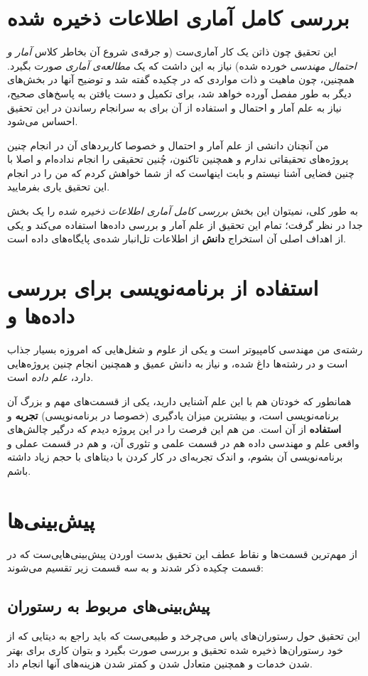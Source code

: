 \documentclass{article}
\begin{document}
	\section{بررسی کامل آماری اطلاعات ذخیره شده}
		این تحقیق چون ذاتن یک کار آماری‌ست (و جرقه‌ی شروع آن بخاطر کلاس \textit{آمار و احتمال مهندسی} خورده شده) نیاز به این داشت که یک \textit{مطالعه‌ی آماری} صورت بگیرد. همچنین، چون ماهیت و ذات مواردی که در چکیده گفته شد و توضیح آنها در بخش‌های دیگر به طور مفصل آورده‌ خواهد شد، برای تکمیل و دست یافتن به پاسخ‌های صحیح، نیاز به علم آمار و احتمال و استفاده از آن برای به سرانجام رساندن در این تحقیق احساس می‌شود.
		
		من آنچنان دانشی از علم آمار و احتمال و خصوصا کاربرد‌های آن در انجام چنین پروژه‌های تحقیقاتی ندارم و همچنین تاکنون، چُنین تحقیقی را انجام نداده‌ام و اصلا با چنین فضایی آشنا نیستم و بابت اینهاست که از شما خواهش کردم که من را در انجام این تحقیق یاری بفرمایید. 
		
		به طور کلی، نمیتوان این بخش \textit{بررسی کامل آماری اطلاعات ذخیره شده} را یک بخش جدا در نظر گرفت؛ تمام این تحقیق از علم آمار و بررسی داده‌ها استفاده می‌کند و یکی از اهداف اصلی‌‌‌ آن استخراج \textbf{دانش} از اطلاعات تل‌انبار شده‌ی پایگاه‌‌های داده است.
		

	\section{استفاده‌ از برنامه‌نویسی برای بررسی داده‌ها و }
		رشته‌ی من مهندسی کامپیوتر است و یکی از علوم و شغل‌‌هایی که امروزه بسیار جذاب است و در رشته‌ها داغ شده، و نیاز به دانش عمیق و همچنین انجام چنین پروژه‌‌هایی دارد، \textit{علم داده‌} است.
		
		همانطور که خودتان هم با این علم آشنایی دارید، یکی از قسمت‌‌های مهم و بزرگ‌ آن برنامه‌نویسی است، و بیشترین میزان یادگیری (خصوصا در برنامه‌نویسی) \textbf{تجربه} و \textbf{استفاده} از آن است. من هم این فرصت را در این پروژه دیدم که درگیر چالش‌های واقعی علم و مهندسی داده هم در قسمت علمی و تئوری آن، و هم در قسمت عملی و برنامه‌نویسی آن بشوم، و اندک تجربه‌ای در کار کردن با دیتا‌های با حجم زیاد داشته باشم.
		
	\section{پیش‌بینی‌ها}
	    از مهم‌ترین قسمت‌ها و نقاط عطف این تحقیق بدست اوردن پیش‌بینی‌هایی‌ست که در قسمت چکیده ذکر شدند و به سه قسمت زیر تقسیم می‌شوند:
	    \subsection{پیش‌بینی‌های مربوط به رستوران}
	    	این تحقیق حول رستوران‌‌های یاس می‌چرخد و طبیعی‌ست که باید راجع به دیتایی که از خود رستوران‌‌ها ذخیره شده تحقیق و بررسی صورت بگیرد و بتوان کاری برای بهتر شدن خدمات و همچنین متعادل شدن و کمتر شدن هزینه‌های آنها انجام داد.
	    	
\end{document}

